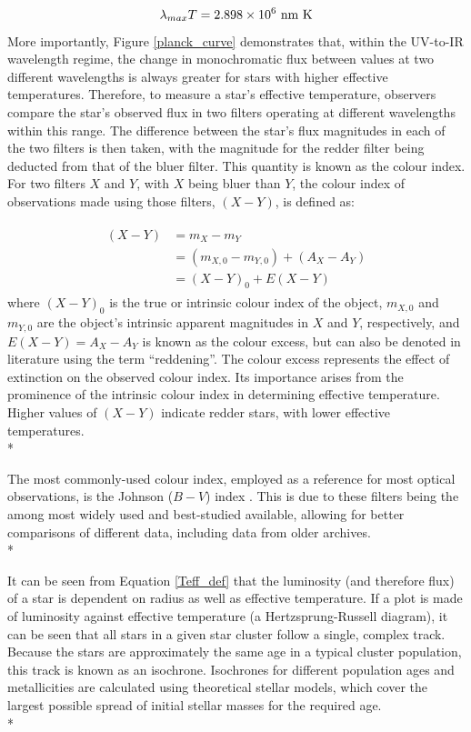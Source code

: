 \documentclass[12pt, a4paper]{report}
\begin{document}
\begin{equation}
\lambda_{max} T = 2.898 \times 10^{6} \textnormal{ nm K}
\label{wien_eq}
\end{equation}
More importantly, Figure \ref{planck_curve} demonstrates that, within the UV-to-IR wavelength regime, the change in monochromatic flux between values at two different wavelengths is always greater for stars with higher effective temperatures. Therefore, to measure a star's effective temperature, observers compare the star's observed flux in two filters operating at different wavelengths within this range. The difference between the star's flux magnitudes in each of the two filters is then taken, with the magnitude for the redder filter being deducted from that of the bluer filter. This quantity is known as the colour index. For two filters $X$ and $Y$, with $X$ being bluer than $Y$, the colour index of observations made using those filters, $(X-Y)$, is defined as:

\begin{align}
\begin{split}
(X-Y) &= m_{X} - m_{Y} \\
 &= (m_{X,0} - m_{Y,0}) + (A_{X} - A_{Y}) \\
 &= (X-Y)_{0} + E(X-Y)
\end{split}
\label{colour_index}
\end{align}
where $(X-Y)_{0}$ is the true or intrinsic colour index of the object, $m_{X,0}$ and $m_{Y,0}$ are the object's intrinsic apparent magnitudes in $X$ and $Y$, respectively, and $E(X-Y) = A_{X} - A_{Y}$ is known as the colour excess, but can also be denoted in literature using the term ``reddening''. The colour excess represents the effect of extinction on the observed colour index. Its importance arises from the prominence of the intrinsic colour index in determining effective temperature. Higher values of $(X-Y)$ indicate redder stars, with lower effective temperatures.\\*

The most commonly-used colour index, employed as a reference for most optical observations, is the Johnson ($B-V$) index \citep{1953ApJ...117..313J}. This is due to these filters being the among most widely used and best-studied available, allowing for better comparisons of different data, including data from older archives.\\*

It can be seen from Equation \ref{Teff_def} that the luminosity (and therefore flux) of a star is dependent on radius as well as effective temperature. If a plot is made of luminosity against effective temperature (a Hertzsprung-Russell diagram), it can be seen that all stars in a given star cluster follow a single, complex track. Because the stars are approximately the same age in a typical cluster population, this track is known as an isochrone. Isochrones for different population ages and metallicities are calculated using theoretical stellar models, which cover the largest possible spread of initial stellar masses for the required age.\\*
\end{document}
